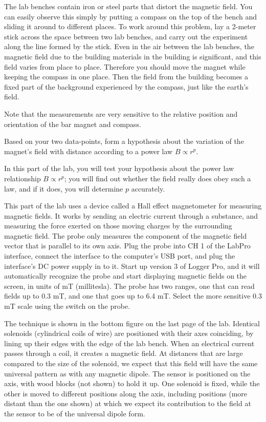 The lab benches contain iron or steel parts that distort the magnetic field.
You can easily observe this simply by putting a compass on the top of the bench and sliding it around
to different places. To work around this problem, lay a 2-meter stick across the space between two
lab benches, and carry out the experiment along the line formed by the stick.
Even in the air between the lab benches, the magnetic field due to the building materials
in the building is significant, and this field varies from place to place.
Therefore you should move the magnet while keeping the compass in one place.
Then the field from the building becomes a fixed part of the background
experienced by the compass, just like the earth's field.

Note that the measurements are very sensitive to the
relative position and orientation of the bar magnet and
compass. 

Based on your two data-points, form a hypothesis about the variation
of the magnet's field with distance according to a power law $B\propto r^p$.


In this part of the lab, you will test your hypothesis about the power
law relationship $B\propto r^p$; you will find out whether the field really
does obey such a law, and if it does, you will determine $p$ accurately.

This part of the lab uses a device called a Hall effect magnetometer for
measuring magnetic fields.  It works by sending an electric current through a
substance, and measuring the force exerted on those moving charges by the surrounding
magnetic field. The probe only measures the component of the
magnetic field vector that is parallel to its own axis. Plug the probe into CH 1 of the
LabPro interface, connect the interface to the computer's USB port, and
plug the interface's DC power supply in to it. Start up version 3 of Logger Pro, and
it will automatically recognize the probe and start displaying magnetic fields
on the screen, in units of mT (millitesla). The probe has two ranges, one that can
read fields up to 0.3 mT, and one that goes up to 6.4 mT.
Select the more sensitive 0.3 mT scale using the
switch on the probe. 

The technique is shown in the bottom figure on the last page of the lab. Identical solenoids
(cylindrical coils of wire) are positioned with their axes coinciding, by lining up
their edges with the edge of the lab bench. When an electrical current passes through
a coil, it creates a magnetic field. At distances that are large compared to the size
of the solenoid, we expect that this field will have the same universal pattern as with
any magnetic dipole. The sensor is positioned on the axis, with wood blocks (not shown)
to hold it up. One solenoid is fixed, while the other is moved to different positions
along the axis, including positions (more distant than the one shown) at which we expect
its contribution to the field at the sensor to be of the universal dipole form.

